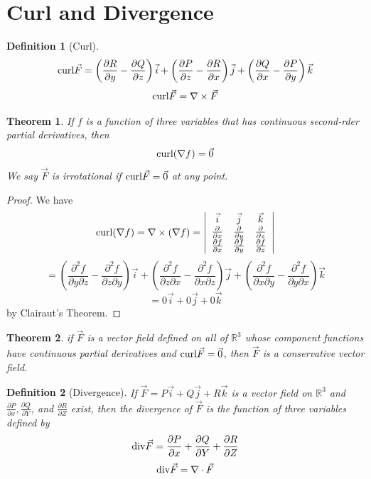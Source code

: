 \documentclass[10pt]{report}
\newtheorem{thm2}{Theorem}[section]
\newtheorem{def2}{Definition}[section]
\newcommand{\grad}{\nabla}
\newcommand{\curl}{\textup{curl}}
\newcommand{\diverg}{\textup{div}}
\begin{document}
\section{Curl and Divergence}
\begin{def2}[Curl]
$$\curl \vec{F} = \left( \frac{\partial R}{\partial y} - \frac{\partial Q}{\partial z}\right)\vec{i} +\left( \frac{\partial P}{\partial z} - \frac{\partial R}{\partial x}\right)\vec{j} +\left( \frac{\partial Q}{\partial x} - \frac{\partial P}{\partial y}\right)\vec{k}$$
$$\curl\vec{F} = \grad \times \vec{F}$$
\end{def2}
\begin{thm2}
If $f$ is a function of three variables that has continuous second-rder partial derivatives, then
$$\curl(\grad f) = \vec{0}$$
We say $\vec{F}$ is irrotational if $\curl \vec{F}=\vec{0}$ at any point.
\end{thm2}
\begin{proof}
We have
$$\curl(\grad f)=\grad \times (\grad f) = \left| \begin{array}{c c c}
\vec{i} & \vec{j} & \vec{k}\\
\frac{\partial}{\partial x} & \frac{\partial}{\partial y} & \frac{\partial}{\partial z}\\
\frac{\partial f}{\partial x} & \frac{\partial f}{\partial y} & \frac{\partial f}{\partial z}
\end{array}\right|$$
$$=\left( \frac{\partial^2 f}{\partial y\partial z} - \frac{\partial^2 f}{\partial z\partial y}\right)\vec{i} + \left( \frac{\partial^2 f}{\partial z\partial x} - \frac{\partial^2 f}{\partial x\partial z}\right)\vec{j} +\left( \frac{\partial^2 f}{\partial x\partial y} - \frac{\partial^2 f}{\partial y\partial x}\right)\vec{k}$$
$$=0\vec{i}+0\vec{j}+0\vec{k}$$
by Clairaut's Theorem.
\end{proof}
\begin{thm2}
if $\vec{F}$ is a vector field defined on all of $\mathbb{R}^3$ whose component functions have continuous partial derivatives and $\curl\vec{F} = \vec{0}$, then $\vec{F}$ is a conservative vector field.
\end{thm2}
\begin{def2}[Divergence]
If $\vec{F}=P\vec{i}+Q\vec{j}+R\vec{k}$ is a vector field on $\mathbb{R}^3$ and $\frac{\partial P}{\partial x}, \frac{\partial Q}{\partial Y}$, and $\frac{\partial R}{\partial Z}$ exist, then the divergence of $\vec{F}$ is the function of three variables defined by
$$\diverg\vec{F} = \frac{\partial P}{\partial x} + \frac{\partial Q}{\partial Y} + \frac{\partial R}{\partial Z}$$
$$\diverg\vec{F} = \grad\cdot\vec{F}$$
\end{def2}
\end{document}

